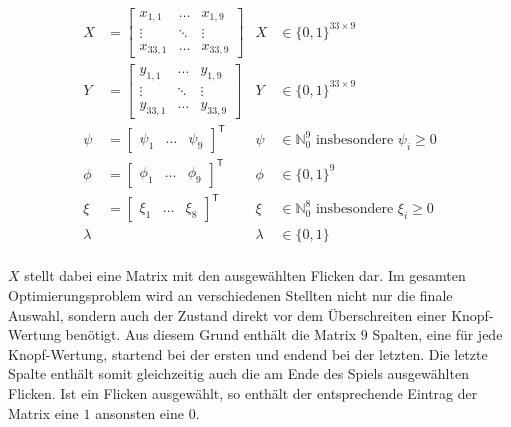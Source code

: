 \begin{align*}
    X       & = \begin{bmatrix}
                    x_{1,1}  & \dots  & x_{1,9}  \\
                    \vdots   & \ddots & \vdots   \\
                    x_{33,1} & \dots  & x_{33,9}
                \end{bmatrix} & X       & \in \{0,1\}^{33 \times 9}                                                 \\
    Y       & = \begin{bmatrix}
                    y_{1,1}  & \dots  & y_{1,9}  \\
                    \vdots   & \ddots & \vdots   \\
                    y_{33,1} & \dots  & y_{33,9}
                \end{bmatrix} & Y       & \in \{0,1\}^{33 \times 9}                                                 \\
    \psi    & = \begin{bmatrix}
                    \psi_1 & \dots & \psi_9
                \end{bmatrix}^\mathsf{T}        & \psi    & \in \mathbb{N}_0^{9} \text{ insbesondere } \psi_i \ge 0 \\
    \phi    & = \begin{bmatrix}
                    \phi_1 & \dots & \phi_9
                \end{bmatrix}^\mathsf{T}        & \phi    & \in \{0,1\}^{9}                                         \\
    \xi     & = \begin{bmatrix}
                    \xi_1 & \dots & \xi_8
                \end{bmatrix}^\mathsf{T}        & \xi     & \in \mathbb{N}_0^{8} \text{ insbesondere } \xi_i \ge 0  \\
    \lambda &                                 & \lambda & \in \{0,1\}                                               \\
\end{align*}

\vspace*{-1cm}

$X$ stellt dabei eine Matrix mit den ausgewählten Flicken dar. Im gesamten Optimierungsproblem wird an verschiedenen Stellten nicht nur die finale Auswahl, sondern auch der Zustand direkt vor dem Überschreiten einer Knopf-Wertung benötigt. Aus diesem Grund enthält die Matrix $9$ Spalten, eine für jede Knopf-Wertung, startend bei der ersten und endend bei der letzten. Die letzte Spalte enthält somit gleichzeitig auch die am Ende des Spiels ausgewählten Flicken. Ist ein Flicken ausgewählt, so enthält der entsprechende Eintrag der Matrix eine $1$ ansonsten eine $0$.

